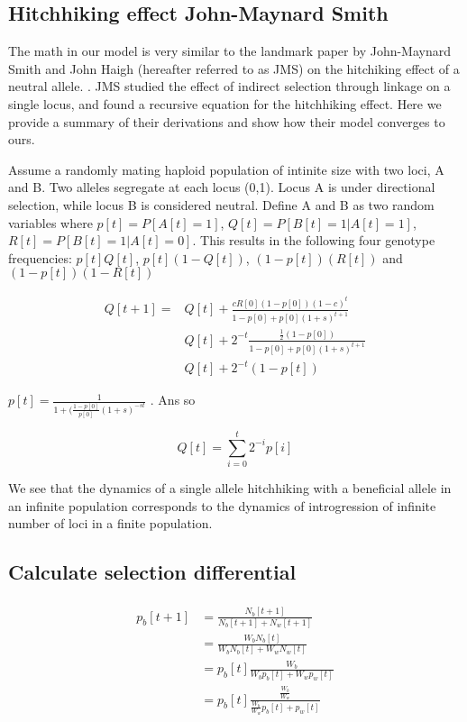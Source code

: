 \documentclass[a4paper,10pt]{article}
\begin{document}
\subsection*{Hitchhiking effect John-Maynard Smith}

The math in our model is very similar to the landmark paper by John-Maynard Smith and John Haigh (hereafter referred to as JMS) on the hitchiking effect of a neutral allele. \cite{JohnMarynardSmith1973}. JMS studied the effect of indirect selection through linkage on a single locus, and found a recursive equation for the hitchhiking effect. Here we provide a summary of their derivations and show how their model converges to ours.

Assume a randomly mating haploid population of intinite size with two loci, A and B. Two alleles segregate at each locus (0,1). Locus A is under directional selection, while locus B is considered neutral. Define A and B as two random variables where  $p[t] = P[A[t]=1]$, $Q[t] = P[B[t]=1|A[t]=1]$, $R[t] = P[B[t]=1|A[t]=0]$. This results in the following four genotype frequencies: $p[t]Q[t]$, $p[t](1-Q[t])$, $(1-p[t])(R[t])$ and $(1-p[t])(1-R[t])$

\begin{equation}
\begin{split}
    Q[t+1] = &Q[t]+ \frac{cR[0](1-p[0])(1-c)^t}{1-p[0]+p[0](1+s)^{t+1}} \\
             &Q[t]+ 2^{-t} \frac{\frac{1}{2}(1-p[0])}{1-p[0]+p[0](1+s)^{t+1}} \\
             &Q[t]+ 2^{-t} (1-p[t])
\end{split}
\end{equation}

$p[t] = \frac{1}{1+(\frac{1-p[0]}{p[0]}(1+s)^{-st}}$ \cite{Crow and Kimura An introduction to popluation}. Ans so

\begin{equation}
    Q[t] = \sum_{i=0}^t 2^{-i} p[i]
\end{equation}

We see that the dynamics of a single allele hitchhiking with a beneficial allele in an infinite population corresponds to the dynamics of introgression of infinite number of loci in a finite population.


\subsection*{Calculate selection differential}
\begin{equation}
    \begin{array}{l}
    \begin{split}
    p_b[t+1] &= \frac{N_b[t+1]}{N_b[t+1]+N_w[t+1]} \\
             &= \frac{W_bN_b[t]}{W_b N_b[t]+W_w N_w[t]} \\
             &= p_b[t]\frac{W_b}{W_b p_b[t]+W_wp_w[t]} \\
             &= p_b[t]\frac{\frac{W_b}{W_w}}{\frac{W_b}{W_w} p_b[t]+p_w[t]} \\
    \end{split}
    \end{array}
\end{equation}
\end{document}
